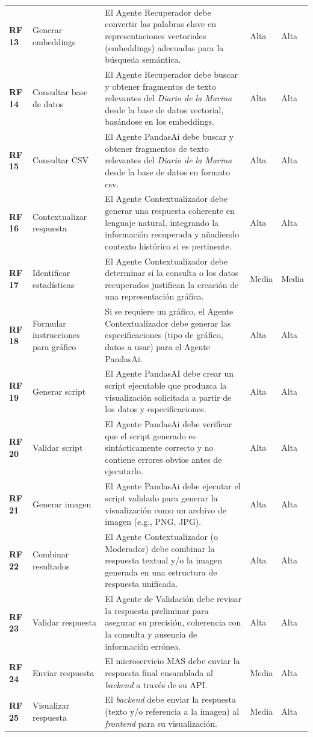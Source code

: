 \begin{longtable}{@{}l >{\raggedright\arraybackslash}p{4.5cm} >{\raggedright\arraybackslash}p{6.5cm} l l@{}}
	\textbf{RF 13} & Generar embeddings & El Agente Recuperador debe convertir las palabras clave en representaciones vectoriales (embeddings) adecuadas para la búsqueda semántica. & Alta & Alta \\ 
	\textbf{RF 14} & Consultar base de datos & El Agente Recuperador debe buscar y obtener fragmentos de texto relevantes del \textit{Diario de la Marina} desde la base de datos vectorial, basándose en los embeddings. & Alta & Alta \\
	\textbf{RF 15} & Consultar CSV & El Agente PandasAi debe buscar y obtener fragmentos de texto relevantes del \textit{Diario de la Marina} desde la base de datos en formato csv. & Alta & Alta \\ 
	\textbf{RF 16} & Contextualizar respuesta & El Agente Contextualizador debe generar una respuesta coherente en lenguaje natural, integrando la información recuperada y añadiendo contexto histórico si es pertinente. & Alta & Alta \\ 
	\textbf{RF 17} & Identificar estadísticas & El Agente Contextualizador debe determinar si la consulta o los datos recuperados justifican la creación de una representación gráfica. & Media & Media \\ 
	\textbf{RF 18} & Formular instrucciones para gráfico & Si se requiere un gráfico, el Agente Contextualizador debe generar las especificaciones (tipo de gráfico, datos a usar) para el Agente PandasAi. & Alta & Alta \\ 
	\textbf{RF 19} & Generar script & El Agente PandasAI debe crear un script ejecutable que produzca la visualización solicitada a partir de los datos y especificaciones. & Alta & Alta \\ 
	\textbf{RF 20} & Validar script & El Agente PandasAi debe verificar que el script generado es sintácticamente correcto y no contiene errores obvios antes de ejecutarlo. & Alta & Alta \\ 
	\textbf{RF 21} & Generar imagen & El Agente PandasAi debe ejecutar el script validado para generar la visualización como un archivo de imagen (e.g., PNG, JPG). & Alta & Alta \\ 
	\textbf{RF 22} & Combinar resultados & El Agente Contextualizador (o Moderador) debe combinar la respuesta textual y/o la imagen generada en una estructura de respuesta unificada. & Alta & Alta \\ 
	\textbf{RF 23} & Validar respuesta & El Agente de Validación debe revisar la respuesta preliminar para asegurar su precisión, coherencia con la consulta y ausencia de información errónea. & Alta & Alta \\  
	\textbf{RF 24} & Enviar respuesta & El microservicio MAS debe enviar la respuesta final ensamblada al \textit{backend} a través de su API. & Media & Alta \\ 
	\textbf{RF 25} & Visualizar respuesta & El \textit{backend} debe enviar la respuesta (texto y/o referencia a la imagen) al \textit{frontend} para su visualización. & Media & Alta \\ 
	
\end{longtable}

